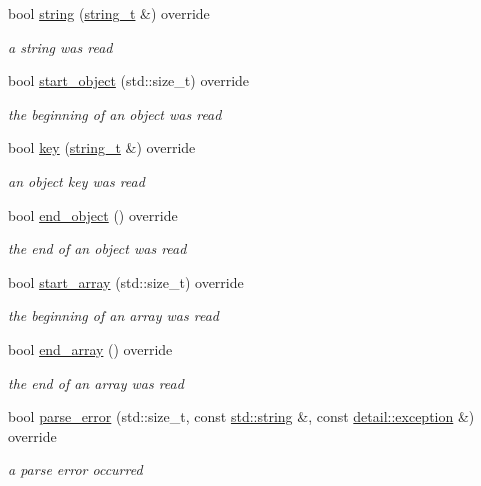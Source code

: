 \begin{DoxyCompactItemize}
bool \hyperlink{classnlohmann_1_1detail_1_1json__sax__acceptor_a72e61155545d43bb829c9a9211978300}{string} (\hyperlink{structnlohmann_1_1json__sax_ae01977a9f3c5b3667b7a2929ed91061e}{string\+\_\+t} \&) override
\begin{DoxyCompactList}\small\item\em a string was read \end{DoxyCompactList}\item 
bool \hyperlink{classnlohmann_1_1detail_1_1json__sax__acceptor_ace7998d71c96f939facaa19164316193}{start\+\_\+object} (std\+::size\+\_\+t) override
\begin{DoxyCompactList}\small\item\em the beginning of an object was read \end{DoxyCompactList}\item 
bool \hyperlink{classnlohmann_1_1detail_1_1json__sax__acceptor_aba0060ee0b3156682d93bbd4be96a0cc}{key} (\hyperlink{structnlohmann_1_1json__sax_ae01977a9f3c5b3667b7a2929ed91061e}{string\+\_\+t} \&) override
\begin{DoxyCompactList}\small\item\em an object key was read \end{DoxyCompactList}\item 
bool \hyperlink{classnlohmann_1_1detail_1_1json__sax__acceptor_aec85a55e7febe5edef2235a55ce7b0bc}{end\+\_\+object} () override
\begin{DoxyCompactList}\small\item\em the end of an object was read \end{DoxyCompactList}\item 
bool \hyperlink{classnlohmann_1_1detail_1_1json__sax__acceptor_aa71d9a89f01f3aa31f573991def61f08}{start\+\_\+array} (std\+::size\+\_\+t) override
\begin{DoxyCompactList}\small\item\em the beginning of an array was read \end{DoxyCompactList}\item 
bool \hyperlink{classnlohmann_1_1detail_1_1json__sax__acceptor_a32579cf8b5dda19a09810f4d6f9ff9af}{end\+\_\+array} () override
\begin{DoxyCompactList}\small\item\em the end of an array was read \end{DoxyCompactList}\item 
bool \hyperlink{classnlohmann_1_1detail_1_1json__sax__acceptor_afd1b2e566b6b5911131f68054e619829}{parse\+\_\+error} (std\+::size\+\_\+t, const \hyperlink{namespacenlohmann_1_1detail_a1ed8fc6239da25abcaf681d30ace4985ab45cffe084dd3d20d928bee85e7b0f21}{std\+::string} \&, const \hyperlink{classnlohmann_1_1detail_1_1exception}{detail\+::exception} \&) override
\begin{DoxyCompactList}\small\item\em a parse error occurred \end{DoxyCompactList}\end{DoxyCompactItemize}
